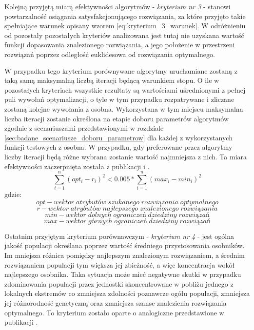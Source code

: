 \par 
Kolejną przyjętą miarą efektywności algorytmów - \emph{kryterium nr 3} - stanowi powtarzalność osiągania satysfakcjonującego rozwiązania, za które przyjęto takie spełniające warunek opisany wzorem \ref{eq:kryterium_3_warunek}. W odróżnieniu od pozostały pozostałych kryteriów analizowana jest tutaj nie uzyskana wartość funkcji dopasowania znalezionego rozwiązania, a jego położenie w przestrzeni rozwiązań poprzez odległość euklidesowa od rozwiązania optymalnego.
\par 
W przypadku tego kryterium porównywane algorytmy uruchamiane zostaną z taką samą maksymalną liczbą iteracji będącą warunkiem stopu. O ile w pozostałych kryteriach wszystkie rezultaty są wartościami uśrednionymi z pełnej puli wywołań optymalizacji, o tyle w tym przypadku rozpatrywane i zliczane zostaną kolejne wywołania z osobna. Wykorzystana w tym miejscu maksymalna liczba iteracji zostanie określona na etapie doboru parametrów algorytmów zgodnie z scenariuszami przedstawionymi w rozdziale \ref{sec:badane_scenariusze_doboru_parametrow} dla każdej z wykorzystanych funkcji testowych z osobna. W przypadku, gdy preferowane przez algorytmy liczby iteracji będą różne wybrana zostanie wartość najmniejsza z nich. Ta miara efektywności zaczerpnięta została z publikacji \cite{elbeltagi2005comparison} i \cite{mullen2014continuous}. 
\begin{equation} \label{eq:kryterium_3_warunek}
\sum_{i=1}^{n}\left(opt_i-r_i\right)^2 < 0.005*\sum_{i=1}^{n}\left(max_i-min_i\right)^2
\end{equation}
gdzie:
\[opt - wektor\; atrybutów\; szukanego\; rozwiązania\; optymalnego\]
\[r - wektor\; atrybutów\; najlepszego\; znalezionego\; rozwiązania\]
\[min - wektor\; dolnych\; ograniczeń\; dziedziny\; rozwiązań\]
\[max - wektor\; górnych\; ograniczeń\; dziedziny\; rozwiązań\]

\par 
Ostatnim przyjętym kryterium porównawczym - \emph{kryterium nr 4} - jest ogólna jakość populacji określana poprzez wartość średniego przystosowania osobników. Im mniejsza różnica pomiędzy najlepszym znalezionym rozwiązaniem, a średnim rozwiązaniem populacji tym większa jej zbieżność, a więc koncentracja wokół najlepszego osobnika. Taka sytuacja może mieć negatywne skutki w przypadku zdominowania populacji przez jednostki skoncentrowane w pobliżu jednego z lokalnych ekstremów co zmniejsza zdolności poznawcze ogółu populacji, zmniejsza jej różnorodność genetyczną oraz zmniejsza szanse znalezienia rozwiązania optymalnego. To kryterium zostało oparte o analogiczne przedstawione w publikacji \cite{ong2006classification}.



